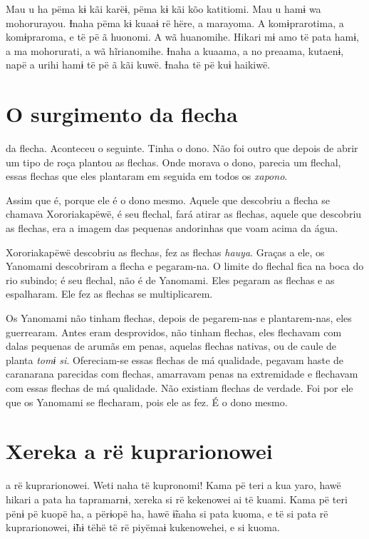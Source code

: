 Mau u ha pëma kɨ kãi karëɨ, pëma kɨ kãi kõo katitiomi. Mau u hamɨ wa
mohorurayou. Ɨnaha pëma kɨ kuaaɨ rë hëre, a marayoma. A komɨprarotima, a
komɨpraroma, e të pë ã huonomi. A wã huanomihe. Hikari mɨ amo të pata
hamɨ, a ma mohorurati, a wã hĩrianomihe. Ɨnaha a kuaama, a no preaama,
kutaenɨ, napë a urihi hamɨ të pë ã kãi kuwë. Ɨnaha të pë kuɨ haikiwë.

\chapter{O surgimento da flecha}

 da flecha. Aconteceu o seguinte. Tinha o dono. Não foi outro
que depois de abrir um tipo de roça plantou as flechas. Onde morava o
dono, parecia um flechal, essas flechas que eles plantaram em seguida em
todos os \textit{xapono}.

Assim que é, porque ele é o dono mesmo. Aquele que descobriu a flecha se
chamava Xororiakapëwë, é seu flechal, fará atirar as flechas, aquele que
descobriu as flechas, era a imagem das pequenas andorinhas que voam
acima da água. 

Xororiakapëwë descobriu as flechas, fez as flechas \textit{hauya}. Graças
 a ele, os Yanomami descobriram a flecha e pegaram-na. O limite do
 flechal fica na boca do rio subindo; é seu flechal, não é de Yanomami.
 Eles pegaram as flechas e as espalharam. Ele fez as flechas se
 multiplicarem. 

Os Yanomami não tinham flechas, depois de pegarem-nas e plantarem-nas,
eles guerrearam. Antes eram desprovidos, não tinham flechas, eles
flechavam com dalas pequenas de arumãs em penas, aquelas flechas nativas,
ou de caule de planta \textit{tomɨ si}. Ofereciam-se essas flechas de má
qualidade, pegavam haste de caranarana parecidas com flechas, amarravam
penas na extremidade e flechavam com essas flechas de má qualidade. Não
existiam flechas de verdade. Foi por ele que os Yanomami se flecharam,
pois ele as fez. É o dono mesmo. 

\chapter{Xereka a rë kuprarionowei}
 
 a rë kuprarionowei. Weti naha të kupronomi! Kama pë teri a kua
yaro, hawë hikari a pata ha tapramarnɨ, xereka si rë kekenowei ai të
kuami. Kama pë teri pënɨ pë kuopë ha, a përɨopë ha, hawë ɨ̃naha si pata
kuoma, e të si pata rë kuprarionowei, ɨ̃hɨ tëhë të rë
piyëmaɨ kukenowehei, e si kuoma. 

